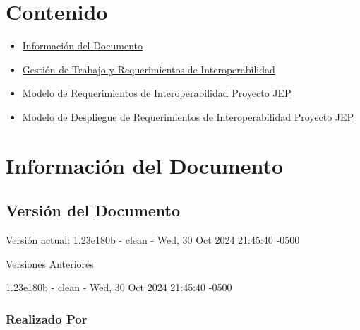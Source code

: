 \documentclass[
  paper=a4,
  ,captions=tableheading
]{scrartcl}
\providecommand{\tightlist}{%
  \setlength{\itemsep}{0pt}\setlength{\parskip}{0pt}}
\renewenvironment{quote}{\begin{customblockquote}\list{}{\rightmargin=0em\leftmargin=0em}%
\item\relax\color{blockquote-text}\ignorespaces}{\unskip\unskip\endlist\end{customblockquote}}
\begin{document}



\section{Contenido}\label{sec:contenido}

\begin{itemize}
\tightlist
\item
  \hyperref[informaciuxf3n-del-documento]{Información del Documento}
\item
  \hyperref[gestiuxf3n-de-trabajo-y-requerimientos-de-interoperabilidad]{Gestión
  de Trabajo y Requerimientos de Interoperabilidad}
\item
  \hyperref[modelo-de-requerimientos-de-interoperabilidad-proyecto-jep]{Modelo
  de Requerimientos de Interoperabilidad Proyecto JEP}
\item
  \hyperref[modelo-de-despliegue-de-requerimientos-de-interoperabilidad-proyecto-jep]{Modelo
  de Despliegue de Requerimientos de Interoperabilidad Proyecto JEP}
\end{itemize}

\newpage

\section{Información del
Documento}\label{sec:informaciuxf3n-del-documento}

\subsection{Versión del Documento}\label{sec:versiuxf3n-del-documento}

\begin{quote}
\end{quote}

Versión actual: 1.23e180b - clean - Wed, 30 Oct 2024 21:45:40 -0500

Versiones Anteriores

1.23e180b - clean - Wed, 30 Oct 2024 21:45:40 -0500

\subsubsection{Realizado Por}\label{sec:realizado-por}
\end{document}
